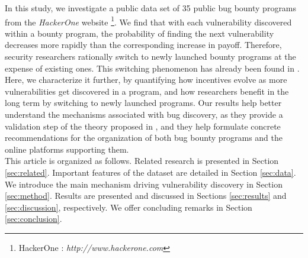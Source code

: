 In this study, we investigate a public data set of 35 public bug bounty programs from the  {\it HackerOne} website \footnote{HackerOne : {\it http://www.hackerone.com}}. We find that with each vulnerability discovered within a bounty program, the probability of finding the next vulnerability decreases more rapidly than the corresponding increase in payoff. Therefore, security researchers rationally switch to newly launched bounty programs at the expense of existing ones. This switching phenomenon has already been found in \cite{zhao2015empirical}. Here, we characterize it further, by quantifying how incentives evolve as more vulnerabilities get discovered in a program, and how researchers benefit in the long term by switching to newly launched programs. Our results help better understand the mechanisms associated with bug discovery, as they provide a validation step of the theory proposed in \cite{brady1999murphy}, and they help formulate concrete recommendations for the organization of both bug bounty programs and the online platforms supporting them.\\

This article is organized as follows. Related research is presented in Section \ref{sec:related}. Important features of the dataset are detailed in Section \ref{sec:data}. We introduce the main mechanism driving vulnerability discovery in Section \ref{sec:method}. Results are presented and discussed in Sections \ref{sec:results} and \ref{sec:discussion}, respectively. We offer concluding remarks in Section \ref{sec:conclusion}.

